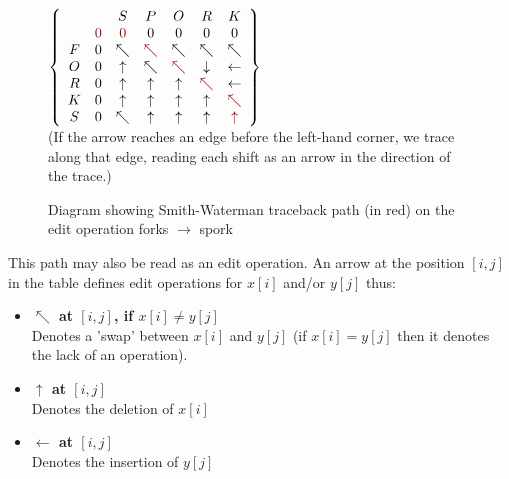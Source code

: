 \documentclass[a4paper,11pt,twoside,notitlepage]{article}
\begin{document}
        \begin{figure}[h!]
          \centering
          $\left\{
                \begin{array}{ccccccc}
                    &   & S & P & O & R & K \\
                    & \color{red}{0} & \color{red}{0} & 0 & 0 & 0 & 0 \\
                  F & 0 & \nwarrow & \color{red}{\nwarrow} & \nwarrow & \nwarrow & \nwarrow \\
                  O & 0 & \uparrow & \nwarrow & \color{red}{\nwarrow} & \downarrow & \leftarrow \\
                  R & 0 & \uparrow & \uparrow & \uparrow & \color{red}{\nwarrow} & \leftarrow \\
                  K & 0 & \uparrow & \uparrow & \uparrow & \uparrow & \color{red}{\nwarrow} \\
                  S & 0 & \nwarrow & \uparrow & \uparrow & \uparrow & \color{red}{\uparrow} \\
                \end{array}\right\} $\\
                (If the arrow reaches an edge before the left-hand
                corner, we trace along that edge, reading each shift
                as an arrow in the direction of the trace.)
                \caption{Diagram showing Smith-Waterman traceback path
                  (in red) on the edit operation forks $\rightarrow$
                  spork}
          \label{fig:smith-waterman-traceback}
        \end{figure}

        This path may also be read as an edit operation. An arrow at
        the position $[i,j]$ in the table defines edit operations for
        $x[i]$ and/or $y[j]$ thus:
        \begin{itemize}
          \item \textbf{$\nwarrow$ at $[i,j]$, if $x[i] \neq y[j]$}
            \\ Denotes a 'swap' between $x[i]$ and $y[j]$ (if $x[i] =
            y[j]$ then it denotes the lack of an operation).
          \item \textbf{$\uparrow$ at $[i,j]$}\\Denotes the deletion
            of $x[i]$
          \item \textbf{$\leftarrow$ at $[i,j]$}\\Denotes the
            insertion of $y[j]$
        \end{itemize}
\end{document}
